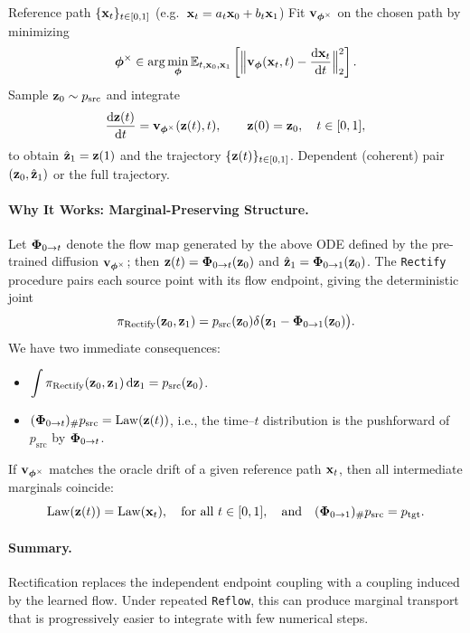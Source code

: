 \begin{algorithm}[H]
\caption{\texttt{Rectify} Operation\label{alg:Rectify}}
\begin{algorithmic}[1]
\Require Reference path $\{{\mathbf{x}}_t\}_{t\in[0,1]}$ (e.g.\ ${\mathbf{x}}_t=a_t{\mathbf{x}}_0+b_t{\mathbf{x}}_1$)
\State {} Fit ${\mathbf{v}}_{{\bm{\phi}}^\times}$ on the chosen path by minimizing
\[
{\bm{\phi}}^\times \in \arg\min_{{\bm{\phi}}} 
\mathbb{E}_{t,{\mathbf{x}}_0,{\mathbf{x}}_1} \left[\Big\|{\mathbf{v}}_{{\bm{\phi}}}({\mathbf{x}}_t,t)-\frac{\mathop{}\!\mathrm{d} {\mathbf{x}}_t}{\mathop{}\!\mathrm{d} t}\Big\|_2^2\right].
\]
\State {} Sample ${\mathbf{z}}_0 \sim p_{\text{src}}$ and integrate
\[
\frac{\mathop{}\!\mathrm{d} {\mathbf{z}}(t)}{\mathop{}\!\mathrm{d} t}={\mathbf{v}}_{{\bm{\phi}}^\times}({\mathbf{z}}(t),t),\qquad {\mathbf{z}}(0)={\mathbf{z}}_0,\quad t\in[0,1],
\]
to obtain $\hat{{\mathbf{z}}}_1={\mathbf{z}}(1)$ and the trajectory $\{{\mathbf{z}}(t)\}_{t\in[0,1]}$.
\Ensure Dependent (coherent) pair $({\mathbf{z}}_0,\hat{{\mathbf{z}}}_1)$ or the full trajectory.
\end{algorithmic}
\end{algorithm}

\paragraph{Why It Works: Marginal-Preserving Structure.}
Let ${\bm{\Phi}}_{0\to t}$ denote the flow map generated by the above ODE defined by the pre-trained diffusion ${\mathbf{v}}_{{\bm{\phi}}^\times}$; then ${\mathbf{z}}(t)={\bm{\Phi}}_{0\to t}({\mathbf{z}}_0)$ and $\hat{{\mathbf{z}}}_1={\bm{\Phi}}_{0\to 1}({\mathbf{z}}_0)$. The \texttt{Rectify} procedure pairs each source point with its flow endpoint, giving the deterministic joint
\[
\pi_{\text{Rectify}}({\mathbf{z}}_0,{\mathbf{z}}_1)
= p_{\text{src}}({\mathbf{z}}_0) \delta \big({\mathbf{z}}_1-{\bm{\Phi}}_{0\to 1}({\mathbf{z}}_0)\big).
\]
We have two immediate consequences:
\begin{itemize}
    \item {} 
    $\displaystyle \int \pi_{\text{Rectify}}({\mathbf{z}}_0,{\mathbf{z}}_1) \mathop{}\!\mathrm{d} {\mathbf{z}}_1
    = p_{\text{src}}({\mathbf{z}}_0)$.
    \item {} 
    $\displaystyle ({\bm{\Phi}}_{0\to t})_{\#}p_{\text{src}}=\mathrm{Law}({\mathbf{z}}(t))$, i.e., the time–$t$ distribution is the pushforward of $p_{\text{src}}$ by ${\bm{\Phi}}_{0\to t}$.
\end{itemize}
If ${\mathbf{v}}_{{\bm{\phi}}^\times}$ matches the oracle drift of a given reference path ${\mathbf{x}}_t$, then all intermediate marginals coincide:
\[
\mathrm{Law}({\mathbf{z}}(t))=\mathrm{Law}({\mathbf{x}}_t),\quad \text{for all }t\in[0,1],
\quad\text{and}\quad
({\bm{\Phi}}_{0\to 1})_{\#}p_{\mathrm{src}}=p_{\mathrm{tgt}}.
\]


\paragraph{Summary.}
Rectification replaces the independent endpoint coupling with a coupling
induced by the learned flow. Under repeated \texttt{Reflow}, this can produce
marginal transport that is progressively easier to integrate with few
numerical steps.

